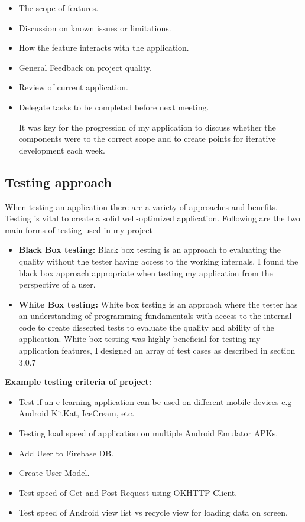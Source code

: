 \begin{itemize}
 \item The scope of features. 
 \item Discussion on known issues or limitations.
 \item How the feature interacts with the application.
 \item General Feedback on project quality.
 \item Review of current application.
 \item Delegate tasks to be completed before next meeting.
 
 It was key for the progression of my application to discuss whether the components were to the correct scope and to create points for iterative development each week.

\end{itemize}

    \subsection{Testing approach}
When testing an application there are a variety of  approaches and benefits. Testing is vital to create a solid well-optimized application. Following are the two main forms of testing used in my project

\begin{itemize}
\item  \textbf{Black Box testing:} Black box testing is an approach to evaluating the quality without the tester having access to the working internals. I found the black box approach appropriate when testing my application from the perspective of a user. 

\item  \textbf{White Box testing:} White box testing is an approach where the tester has an understanding of programming fundamentals with access to the internal code to create dissected tests to evaluate the quality and ability of the application. White box testing was highly beneficial for testing my application features, I designed an array of test cases as described in section 3.0.7  


\end{itemize}


\textbf{Example testing  criteria  of project:}


\begin{itemize}
\item Test if an e-learning application can be used on different mobile devices e.g Android KitKat, IceCream, etc.
\item Testing load speed of application on multiple Android Emulator APKs.
\item Add User to Firebase DB.
\item Create User Model.
\item Test speed of Get and Post  Request using OKHTTP Client.
\item Test speed of Android view list vs recycle view for loading data on  screen.

\end{itemize}

